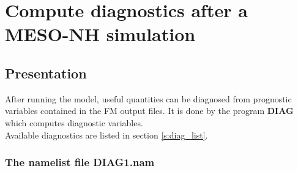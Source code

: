 \chapter{Compute diagnostics after a MESO-NH simulation} \label{ch:diag}
\section{Presentation}

After running the model, useful quantities can be diagnosed from
prognostic variables contained in the FM output files. It is done by
the program {\bf DIAG} which computes diagnostic variables.\\

\noindent Available diagnostics are listed in section \ref{s:diag_list}.\\

\subsection{The namelist file DIAG1.nam } \label{ss:diag_nam}

